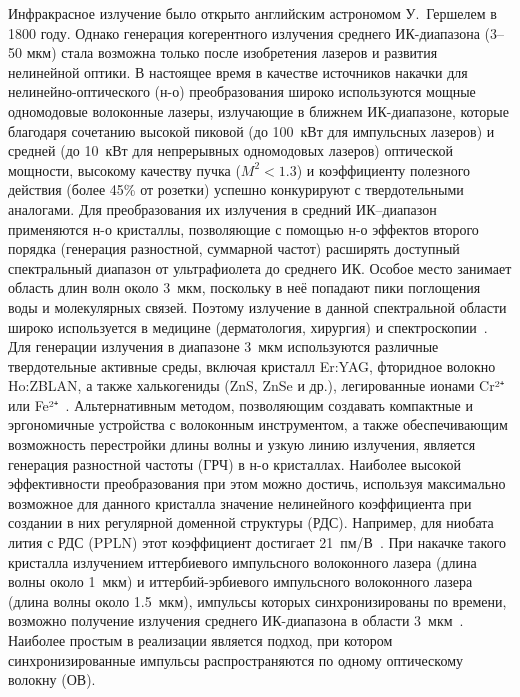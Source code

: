
{\actuality} 

Инфракрасное излучение было открыто английским астрономом У.~Гершелем в 1800 году. Однако генерация когерентного излучения среднего ИК-диапазона (3--50 мкм) стала возможна только после изобретения лазеров и развития нелинейной оптики. В настоящее время в качестве источников накачки для нелинейно-оптического (н-о) преобразования широко используются мощные одномодовые волоконные лазеры, излучающие в ближнем ИК-диапазоне, которые благодаря сочетанию высокой пиковой (до 100~кВт для импульсных лазеров) и средней (до 10~кВт для непрерывных одномодовых лазеров) оптической мощности, высокому качеству пучка ($M^2 < 1.3$) и коэффициенту полезного действия (более 45\% от розетки) успешно конкурируют с твердотельными аналогами. Для преобразования их излучения в средний ИК--диапазон применяются н-о кристаллы, позволяющие с помощью н-о эффектов второго порядка (генерация разностной, суммарной частот) расширять доступный спектральный диапазон от ультрафиолета до среднего ИК. Особое место занимает область длин волн около $3$~мкм, поскольку в неё попадают пики поглощения воды и молекулярных связей. Поэтому излучение в данной спектральной области широко используется в медицине (дерматология, хирургия) и спектроскопии~\cite{jean2003mid, haas2016advances}. Для генерации излучения в диапазоне 3~мкм используются различные твердотельные активные среды, включая кристалл Er:YAG, фторидное волокно Ho:ZBLAN, а также халькогениды (ZnS, ZnSe и др.), легированные ионами Cr²⁺ или Fe²⁺~\cite{jean2003mid,sumiyoshi1999high,mirov2014progress}.
Альтернативным методом, позволяющим создавать компактные и эргономичные устройства с волоконным инструментом, а также обеспечивающим возможность перестройки длины волны и узкую линию излучения, является генерация разностной частоты (ГРЧ) в н-о кристаллах. Наиболее высокой эффективности преобразования при этом можно достичь, используя максимально возможное для данного кристалла значение нелинейного коэффициента при создании в них регулярной доменной структуры (РДС). Например, для ниобата лития с РДС (PPLN) этот коэффициент достигает 21~пм/В~\cite{Pruneri1996}. При накачке такого кристалла излучением иттербиевого импульсного волоконного лазера (длина волны около 1~мкм) и иттербий-эрбиевого импульсного волоконного лазера (длина волны около 1.5~мкм), импульсы которых синхронизированы по времени, возможно получение излучения среднего ИК-диапазона в области 3~мкм~\cite{larionov2021pp}. Наиболее простым в реализации является подход, при котором синхронизированные импульсы распространяются по одному оптическому волокну (ОВ).

